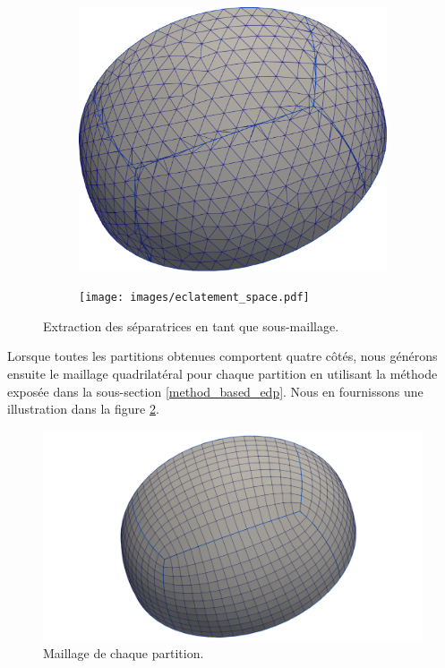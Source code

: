 \begin{figure}[h!]
\centering
\begin{subfigure}{0.49\textwidth}
    \includegraphics[width=\textwidth]{images/split_triangles_space.pdf}
\end{subfigure}
\hfill
\begin{subfigure}{0.49\textwidth}
    \texttt{[image: images/eclatement\_space.pdf]}
\end{subfigure}
\caption{Extraction des séparatrices en tant que sous-maillage.}
\label{fig:extraction}
\end{figure}

Lorsque toutes les partitions obtenues comportent quatre côtés, nous générons ensuite le maillage quadrilatéral pour chaque partition en utilisant la méthode exposée dans la sous-section \ref{method_based_edp}. Nous en fournissons une illustration dans la figure \ref{fig:quad_space}.

\begin{figure}[!h]
  \centering
  \includegraphics[scale=0.24]{images/quad_space.pdf}
  \caption{Maillage de chaque partition.}
  \label{fig:quad_space}
\end{figure}

